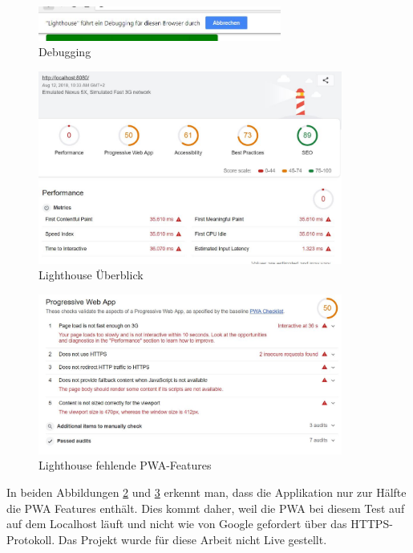 \begin{figure}[h]
	\centering
	\includegraphics[width=8cm]{BilderAllgemein/Test/debuggingLighthouse}\medskip
	\caption{Debugging}
	\label{fig:LighthouseDebugging}
\end{figure}
 

\begin{figure}[H]
	\centering
	\includegraphics[width=10cm]{BilderAllgemein/Test/LightH_beforHTTPS_Overview}\medskip
	\caption{Lighthouse Überblick}
	\label{fig:LightH_beforHTTPS_Overview}
\end{figure}

\begin{figure}[h]
	\centering
	\includegraphics[width=10cm]{BilderAllgemein/Test/PWA_Test_Lighthouse_noHTTPS}\medskip
	\caption{Lighthouse fehlende PWA-Features}
	\label{fig:PWA_Test_Lighthouse_noHTTPS}
\end{figure}

In beiden Abbildungen \ref{fig:LightH_beforHTTPS_Overview} und \ref{fig:PWA_Test_Lighthouse_noHTTPS} erkennt man, dass die Applikation nur zur Hälfte die PWA Features enthält.
Dies kommt daher, weil die \acs{PWA} bei diesem Test auf auf dem Localhost läuft und nicht wie von Google gefordert über das HTTPS-Protokoll.
Das Projekt wurde für diese Arbeit nicht Live gestellt.


